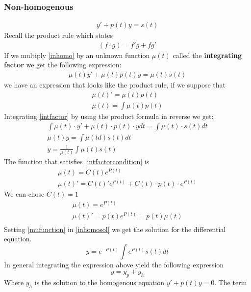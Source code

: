 \subsubsection{Non-homogenous}
\begin{gather}\label{inhomo}
    y' + p(t)y = s(t) 
\end{gather}
Recall the product rule which states
\begin{gather}
   (f \cdot g) = f' g + f g'
\end{gather}
If we multiply \ref{inhomo} by an unknown function \(\mu(t)\) called the \textbf{integrating factor} we get the following expression:
\begin{gather}\label{intfactor}
  \mu(t) y' + \mu(t) p(t)y = \mu(t) s(t) 
\end{gather}
we have an expression that looks like the product rule, if we suppose that 
\begin{gather}\label{intfactorcondition}
  \mu(t)' =  \mu(t) p(t) \\
  \mu(t) = \int \mu(t) p(t)
\end{gather}
Integrating \ref{intfactor} by using the product formula in reverse we get:
\begin{gather}
 \int \mu(t) \cdot y' + \mu(t)\cdot p(t) \cdot y  dt = \int \mu(t) \cdot s(t) dt \\
 \mu (t) y = \int \mu(td) s(t) dt \\
  y = \frac{1}{\mu(t)}\int \mu(t) s(t)  \label{inhomosol}
\end{gather}
The function that satisfies \ref{intfactorcondition} is 
\begin{gather}
  \mu(t) = C(t) e^{P(t)}\\
  \mu(t)' = C(t)' e^{P(t)} + C(t) \cdot p(t) \cdot e^{P(t)}
\end{gather}
We can chose \(C(t) = 1\)
\begin{gather}
   \mu(t)  = e^{P(t)} \label{mufunction}\\ 
\mu(t)' = p(t)e^{P(t)} = p(t)\mu(t)\\
\end{gather}
Setting \ref{mufunction} in \ref{inhomosol} we get the solution for the differential equation.
\begin{equation}
  y = e^{-P(t)}\int e^{P(t)} s(t)dt
\end{equation}
In general integrating the expression above yield the following expression
\begin{equation}
  y = y_p + y_h
\end{equation}
Where \(y_h\) is the solution to the homogenous equation \(y' + p(t)y = 0\). The term
